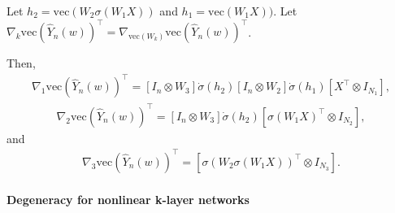 \documentclass[10pt]{article}
\newcommand{\vect}{\mathrm{vec}}
\begin{document}
Let $h_2=\vect(W_2\sigma(W_1X))$ and $h_1=  \vect(W_1X))$. Let $\nabla_{k} \vect(\hat Y_n(w))^\top = \nabla_{\vect(W_k)} \vect(\hat Y_n(w))^\top$. 
 

Then,
\begin{align*}
\nabla_{1} \vect(\hat Y_n(w))^\top =[I_{n} \otimes W_{3}] \dot \sigma(h_2)[I_{n} \otimes W_{2}]  \dot \sigma(h_1) [X^\top \otimes I_{N_1}], 
\end{align*}
\begin{align*}
\nabla_{2}\vect(\hat Y_n(w))^\top =[I_{n} \otimes W_{3}] \dot \sigma(h_2) [\sigma(W_1X)^\top \otimes I_{N_2}], 
\end{align*}
and 
\begin{align*}
\nabla_{3} \vect(\hat Y_n(w))^\top =[\sigma(W_2\sigma(W_1X))^\top \otimes I_{N_{3}}].
\end{align*}

\paragraph{Degeneracy  for nonlinear k-layer networks}
\end{document}
